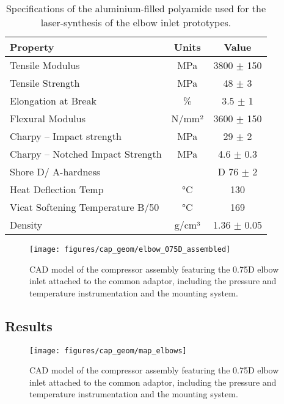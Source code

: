 \begin{table}[htbp]
  \centering
  \caption{Specifications of the aluminium-filled polyamide used for the laser-synthesis of the elbow inlet prototypes.}
    \begin{tabular}{lcc}
    \addlinespace
    \toprule
    \bf Property & \bf Units & \bf Value \\
    \midrule
    Tensile Modulus & MPa   & 3800 $\pm$ 150 \\
    Tensile Strength & MPa   & 48 $\pm$ 3 \\
    Elongation at Break & \%    & 3.5 $\pm$ 1 \\
    Flexural Modulus & N/mm² & 3600 $\pm$ 150 \\
    Charpy – Impact strength & MPa   & 29 $\pm$ 2 \\
    Charpy – Notched Impact Strength & MPa   & 4.6 $\pm$ 0.3 \\
    Shore D/ A-hardness &       & D 76 $\pm$ 2 \\
    Heat Deflection Temp & °C    & 130 \\
    Vicat Softening Temperature B/50 & °C    & 169 \\
    Density & g/cm³ & 1.36 $\pm$ 0.05 \\
    \bottomrule
    \end{tabular}
  \label{tab:alumide_data}
\end{table}


\begin{figure}[h!]
\centering
\texttt{[image: figures/cap\_geom/elbow\_075D\_assembled]}
\caption{CAD model of the compressor assembly featuring the 0.75D elbow inlet attached to the common adaptor, including the pressure and temperature instrumentation and the mounting system.}
\label{fig:elbow_075D_assembled}
\end{figure}

\subsection{Results}

\begin{figure}[h!]
\centering
\texttt{[image: figures/cap\_geom/map\_elbows]}
\caption{CAD model of the compressor assembly featuring the 0.75D elbow inlet attached to the common adaptor, including the pressure and temperature instrumentation and the mounting system.}
\label{fig:map_elbows}
\end{figure}

